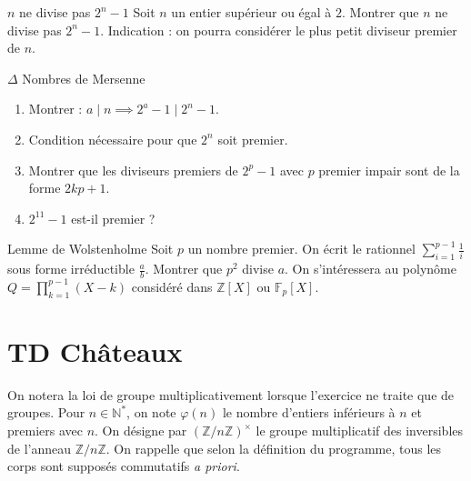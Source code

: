 \documentclass[french,a4paper]{article}
\newcommand{\N}{\mathbb{N}}
\newcommand{\Z}{\mathbb{Z}}
\newcommand{\st}{^*}
\newcommand{\F}{\mathbb{F}}
\theoremstyle{plain}
\theoremstyle{definition}
\theoremstyle{remark}
\begin{document}
\begin{ex}[Moulin.AG.59]{$n$ ne divise pas $2^n-1$}
	Soit $n$ un entier supérieur ou égal à $2$. Montrer que $n$ ne divise pas $2^n-1$. Indication : on pourra considérer le plus petit diviseur premier de $n$.
\end{ex}

\begin{ex}[Moulin.AG.60]{$\Delta$ Nombres de Mersenne}
	\begin{enumerate}
		\item Montrer : $a\mid n\implies 2^a-1\mid 2^n-1$.
		\item Condition nécessaire pour que $2^n$ soit premier.
		\item Montrer que les diviseurs premiers de $2^p-1$ avec $p$ premier impair sont de la forme $2kp+1$.
		\item $2^{11}-1$ est-il premier ?
	\end{enumerate}
\end{ex}

\begin{ex}[Châteaux]{Lemme de Wolstenholme}
	Soit $p$ un nombre premier. On écrit le rationnel $\displaystyle\sum_{i=1}^{p-1}\frac{1}{i}$ sous forme irréductible $\displaystyle\frac{a}{b}$. Montrer que $p^2$ divise $a$. On s'intéressera au polynôme $Q=\displaystyle\prod_{k=1}^{p-1}(X-k)$ considéré dans $\Z[X]$ ou $\F_p[X]$.
\end{ex}

\section{TD Châteaux}
On notera la loi de groupe multiplicativement lorsque l'exercice ne traite que de groupes. Pour $n\in\N\st$, on note $\varphi(n)$ le nombre d'entiers inférieurs à $n$ et premiers avec $n$. On désigne par $(\Z/n\Z)^\times$ le groupe multiplicatif des inversibles de l'anneau $\Z/n\Z$. On rappelle que selon la définition du programme, tous les corps sont supposés commutatifs \textit{a priori}.
\end{document}
